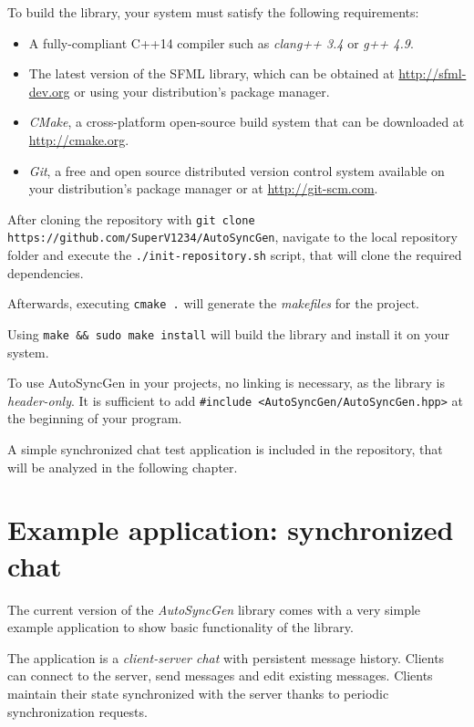 \documentclass{report}
\begin{document}
        To build the library, your system must satisfy the following requirements:
        \begin{itemize}
            \item A fully-compliant C++14 compiler such as \emph{clang++ 3.4} or \emph{g++ 4.9}.
            \item The latest version of the SFML library, which can be obtained at \url{http://sfml-dev.org} or using your distribution's package manager.
            \item \emph{CMake}, a cross-platform open-source build system that can be downloaded at \url{http://cmake.org}.
            \item \emph{Git}, a free and open source distributed version control system available on your distribution's package manager or at \url{http://git-scm.com}.
        \end{itemize}
        
        After cloning the repository with \texttt{git clone https://github.com/SuperV1234/AutoSyncGen}, navigate to the local repository folder and execute the \texttt{./init-repository.sh} script, that will clone the required dependencies.

        Afterwards, executing \texttt{cmake .} will generate the \emph{makefiles} for the project.

        Using \texttt{make && sudo make install} will build the library and install it on your system.

        To use AutoSyncGen in your projects, no linking is necessary, as the library is \emph{header-only}. It is sufficient to add \texttt{#include <AutoSyncGen/AutoSyncGen.hpp>} at the beginning of your program.

        A simple synchronized chat test application is included in the repository, that will be analyzed in the following chapter.

    \newpage

    \chapter{Example application: synchronized chat}

        The current version of the \emph{AutoSyncGen} library comes with a very simple example application to show basic functionality of the library.

        The application is a \emph{client-server chat} with persistent message history.
        Clients can connect to the server, send messages and edit existing messages.
        Clients maintain their state synchronized with the server thanks to periodic synchronization requests.
\end{document}
